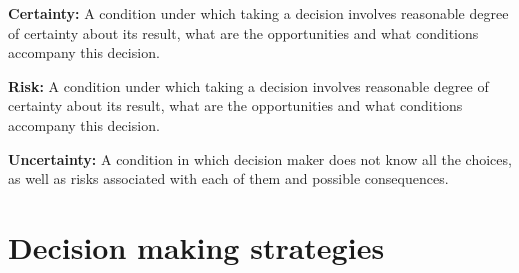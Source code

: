\documentclass[
  12pt,
  oneside]{book}
\theoremstyle{definition}
\theoremstyle{definition}
\theoremstyle{definition}
\theoremstyle{definition}
\theoremstyle{remark}
\begin{document}
\textbf{Certainty:}
A condition under which taking a decision involves reasonable degree of certainty about its result, what are the opportunities and what conditions accompany this decision.

\textbf{Risk:}
A condition under which taking a decision involves reasonable degree of certainty about its result, what are the opportunities and what conditions accompany this decision.

\textbf{Uncertainty:}
A condition in which decision maker does not know all the choices, as well as risks associated with each of them and possible consequences.

\section{Decision making strategies}\label{decision-making-strategies}
\end{document}
